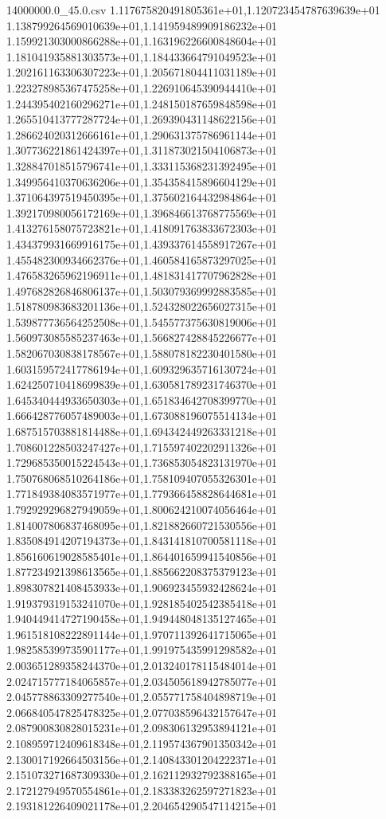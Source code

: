 \begin{filecontents*}{14000000.0_45.0.csv}
1.117675820491805361e+01,1.120723454787639639e+01
1.138799264569010639e+01,1.141959489909186232e+01
1.159921303000866288e+01,1.163196226600848604e+01
1.181041935881303573e+01,1.184433664791049523e+01
1.202161163306307223e+01,1.205671804411031189e+01
1.223278985367475258e+01,1.226910645390944410e+01
1.244395402160296271e+01,1.248150187659848598e+01
1.265510413777287724e+01,1.269390431148622156e+01
1.286624020312666161e+01,1.290631375786961144e+01
1.307736221861424397e+01,1.311873021504106873e+01
1.328847018515796741e+01,1.333115368231392495e+01
1.349956410370636206e+01,1.354358415896604129e+01
1.371064397519450395e+01,1.375602164432984864e+01
1.392170980056172169e+01,1.396846613768775569e+01
1.413276158075723821e+01,1.418091763833672303e+01
1.434379931669916175e+01,1.439337614558917267e+01
1.455482300934662376e+01,1.460584165873297025e+01
1.476583265962196911e+01,1.481831417707962828e+01
1.497682826846806137e+01,1.503079369992883585e+01
1.518780983683201136e+01,1.524328022656027315e+01
1.539877736564252508e+01,1.545577375630819006e+01
1.560973085585237463e+01,1.566827428845226677e+01
1.582067030838178567e+01,1.588078182230401580e+01
1.603159572417786194e+01,1.609329635716130724e+01
1.624250710418699839e+01,1.630581789231746370e+01
1.645340444933650303e+01,1.651834642708399770e+01
1.666428776057489003e+01,1.673088196075514134e+01
1.687515703881814488e+01,1.694342449263331218e+01
1.708601228503247427e+01,1.715597402202911326e+01
1.729685350015224543e+01,1.736853054823131970e+01
1.750768068510264186e+01,1.758109407055326301e+01
1.771849384083571977e+01,1.779366458828644681e+01
1.792929296827949059e+01,1.800624210074056464e+01
1.814007806837468095e+01,1.821882660721530556e+01
1.835084914207194373e+01,1.843141810700581118e+01
1.856160619028585401e+01,1.864401659941540856e+01
1.877234921398613565e+01,1.885662208375379123e+01
1.898307821408453933e+01,1.906923455932428624e+01
1.919379319153241070e+01,1.928185402542385418e+01
1.940449414727190458e+01,1.949448048135127465e+01
1.961518108222891144e+01,1.970711392641715065e+01
1.982585399735901177e+01,1.991975435991298582e+01
2.003651289358244370e+01,2.013240178115484014e+01
2.024715777184065857e+01,2.034505618942785077e+01
2.045778863309277540e+01,2.055771758404898719e+01
2.066840547825478325e+01,2.077038596432157647e+01
2.087900830828015231e+01,2.098306132953894121e+01
2.108959712409618348e+01,2.119574367901350342e+01
2.130017192664503156e+01,2.140843301204222371e+01
2.151073271687309330e+01,2.162112932792388165e+01
2.172127949570554861e+01,2.183383262597271823e+01
2.193181226409021178e+01,2.204654290547114215e+01

\end{filecontents*}
